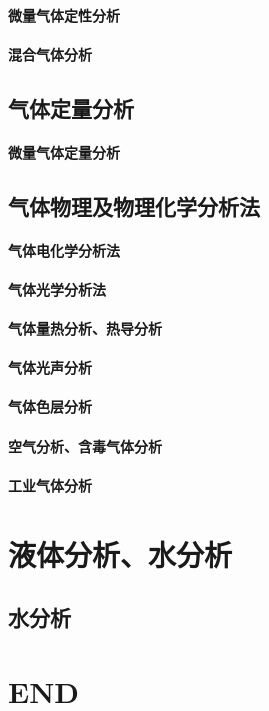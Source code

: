 \documentclass[UTF8]{../03-Chemistry}
\begin{document}
    \subsubsection{微量气体定性分析}
    \subsubsection{混合气体分析}
\section{气体定量分析}
    \subsubsection{微量气体定量分析}
\section{气体物理及物理化学分析法}
    \subsubsection{气体电化学分析法}
    \subsubsection{气体光学分析法}
    \subsubsection{气体量热分析、热导分析}
    \subsubsection{气体光声分析}
    \subsubsection{气体色层分析}
    \subsubsection{空气分析、含毒气体分析}
    \subsubsection{工业气体分析}







\chapter{液体分析、水分析}
\section{水分析}







\chapter{END}
\end{document}
